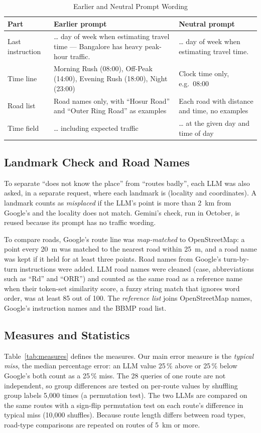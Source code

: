 \documentclass[conference]{IEEEtran}
\begin{document}
\begin{table}[!htb]
\caption{Earlier and Neutral Prompt Wording}
\label{tab:prompt_wording}
\centering
\footnotesize
\begin{tabular}{L{1.4cm}L{3.0cm}L{3.0cm}}
\hline
Part & Earlier prompt & Neutral prompt \\
\hline
Last instruction & \ldots{} day of week when estimating travel time --- Bangalore has heavy peak-hour traffic. & \ldots{} day of week when estimating travel time. \\
Time line & Morning Rush (08:00), Off-Peak (14:00), Evening Rush (18:00), Night (23:00) & Clock time only, e.g.\ 08:00 \\
Road list & Road names only, with ``Hosur Road'' and ``Outer Ring Road'' as examples & Each road with distance and time, no examples \\
Time field & \ldots{} including expected traffic & \ldots{} at the given day and time of day \\
\hline
\end{tabular}
\end{table}

\subsection{Landmark Check and Road Names}
To separate ``does not know the place'' from ``routes badly'', each LLM was also asked, in a separate request, where each landmark is (locality and coordinates). A landmark counts as \emph{misplaced} if the LLM's point is more than 2~km from Google's and the locality does not match. Gemini's check, run in October, is reused because its prompt has no traffic wording.

To compare roads, Google's route line was \emph{map-matched} to OpenStreetMap: a point every 20~m was matched to the nearest road within 25~m, and a road name was kept if it held for at least three points. Road names from Google's turn-by-turn instructions were added. LLM road names were cleaned (case, abbreviations such as ``Rd'' and ``ORR'') and counted as the same road as a reference name when their token-set similarity score, a fuzzy string match that ignores word order, was at least 85 out of 100. The \emph{reference list} joins OpenStreetMap names, Google's instruction names and the BBMP road list.

\subsection{Measures and Statistics}
Table~\ref{tab:measures} defines the measures. Our main error measure is the \emph{typical miss}, the median percentage error: an LLM value 25\,\% above or 25\,\% below Google's both count as a 25\,\% miss. The 28 queries of one route are not independent, so group differences are tested on per-route values by shuffling group labels 5,000 times (a permutation test). The two LLMs are compared on the same routes with a sign-flip permutation test on each route's difference in typical miss (10,000 shuffles). Because route length differs between road types, road-type comparisons are repeated on routes of 5~km or more.
\end{document}
